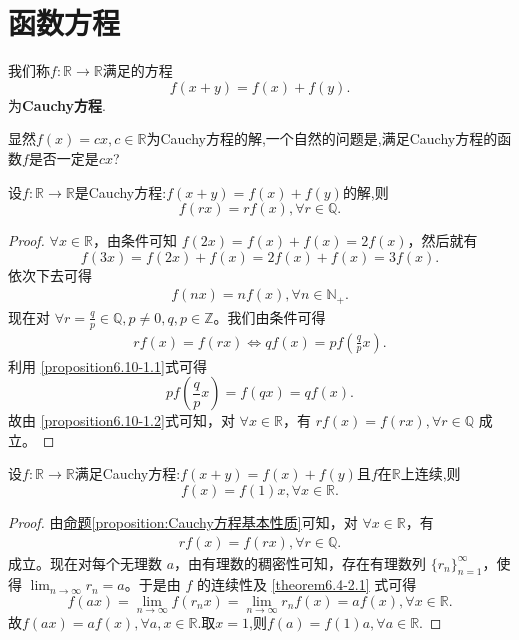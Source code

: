 \documentclass[../../main.tex]{subfiles}
\begin{document}
\section{函数方程}

\begin{definition}
我们称\(f:\mathbb{R}\to\mathbb{R}\)满足的方程
\[
f(x + y)=f(x)+f(y).
\]
为\textbf{Cauchy方程}.
\end{definition}
\begin{note}
显然\(f(x)=cx,c\in\mathbb{R}\)为Cauchy方程的解,一个自然的问题是,满足Cauchy方程的函数\(f\)是否一定是\(cx\)?
\end{note}

\begin{proposition}[Cauchy方程基本性质]\label{proposition:Cauchy方程基本性质}
设\(f:\mathbb{R}\to\mathbb{R}\)是Cauchy方程:$f(x + y)=f(x)+f(y)$的解,则
\[
f(rx)=rf(x),\forall r\in\mathbb{Q}.
\]
\end{proposition}
\begin{proof}
\(\forall x\in \mathbb{R}\)，由条件可知 \(f(2x)=f(x)+f(x)=2f(x)\)，然后就有
\[
f(3x)=f(2x)+f(x)=2f(x)+f(x)=3f(x).
\]
依次下去可得
\begin{align}
f(nx)=nf(x),\forall n\in \mathbb{N}_+. \label{proposition6.10-1.1}
\end{align}
现在对 \(\forall r = \frac{q}{p}\in \mathbb{Q},p\neq 0,q,p\in \mathbb{Z}\)。我们由条件可得
\begin{align}
rf(x)=f(rx)\Leftrightarrow qf(x)=pf\left(\frac{q}{p}x\right).\label{proposition6.10-1.2}
\end{align}
利用 \eqref{proposition6.10-1.1}式可得
\[
pf\left(\frac{q}{p}x\right)=f(qx)=qf(x).
\]
故由 \eqref{proposition6.10-1.2}式可知，对 \(\forall x\in \mathbb{R}\)，有 \(rf(x)=f(rx),\forall r\in \mathbb{Q}\) 成立。
\end{proof}

\begin{theorem}\label{theorem:Cauchy方程加上连续性就能得到解是线性函数}
设\(f:\mathbb{R}\to\mathbb{R}\)满足Cauchy方程:$f(x + y)=f(x)+f(y)$且$f$在$\mathbb{R}$上连续,则
\[
f(x)=f(1)x,\forall x\in\mathbb{R}.
\]
\end{theorem}
\begin{proof}
由\hyperref[proposition:Cauchy方程基本性质]{命题\ref{proposition:Cauchy方程基本性质}}可知，对 \(\forall x\in \mathbb{R}\)，有
\begin{align}
rf(x)=f(rx),\forall r\in \mathbb{Q}. \label{theorem6.4-2.1}  
\end{align}
成立。现在对每个无理数 \(a\)，由有理数的稠密性可知，存在有理数列 \(\{r_n\}_{n = 1}^{\infty}\)，使得 \(\lim_{n\rightarrow \infty}r_n=a\)。于是由 \(f\) 的连续性及 \eqref{theorem6.4-2.1} 式可得
\[
f(ax)=\lim_{n\rightarrow \infty}f(r_nx)=\lim_{n\rightarrow \infty}r_nf(x)=af(x),\forall x\in \mathbb{R}.
\]
故$f(ax)=af(x),\forall a,x\in\mathbb{R}$.取$x=1$,则$f(a)=f(1)a,\forall a\in\mathbb{R}.$
\end{proof}
\end{document}

